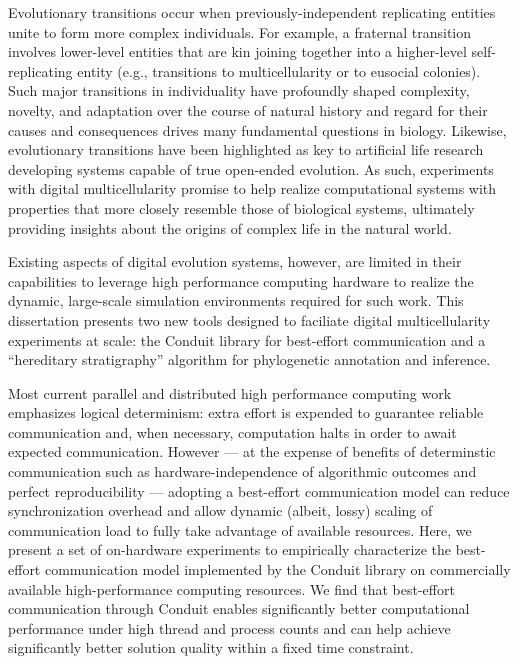 Evolutionary transitions occur when previously-independent replicating entities unite to form more complex individuals.
For example, a fraternal transition involves lower-level entities that are kin joining together into a higher-level self-replicating entity (e.g., transitions to multicellularity or to eusocial colonies).
Such major transitions in individuality have profoundly shaped complexity, novelty, and adaptation over the course of natural history and regard for their causes and consequences drives many fundamental questions in biology.
Likewise, evolutionary transitions have been highlighted as key to artificial life research developing systems capable of true open-ended evolution.
As such, experiments with digital multicellularity promise to help realize computational systems with properties that more closely resemble those of biological systems, ultimately providing insights about the origins of complex life in the natural world.

Existing aspects of digital evolution systems, however, are limited in their capabilities to leverage high performance computing hardware to realize the dynamic, large-scale simulation environments required for such work.
This dissertation presents two new tools designed to faciliate digital multicellularity experiments at scale: the Conduit library for best-effort communication and a ``hereditary stratigraphy'' algorithm for phylogenetic annotation and inference.

Most current parallel and distributed high performance computing work emphasizes logical determinism: extra effort is expended to guarantee reliable communication and, when necessary, computation halts in order to await expected communication.
However --- at the expense of benefits of determinstic communication such as hardware-independence of algorithmic outcomes and perfect reproducibility --- adopting a best-effort communication model can reduce synchronization overhead and allow dynamic (albeit, lossy) scaling of communication load to fully take advantage of available resources.
Here, we present a set of on-hardware experiments to empirically characterize the best-effort communication model implemented by the Conduit library on commercially available high-performance computing resources.
We find that best-effort communication through Conduit enables significantly better computational performance under high thread and process counts and can help achieve significantly better solution quality within a fixed time constraint.

